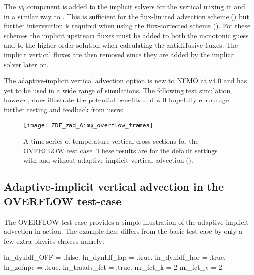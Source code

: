 \documentclass[../main/NEMO_manual]{subfiles}
\begin{document}
The $w_i$ component is added to the implicit solvers for the vertical mixing in
 and  in a similar way to \citep{shchepetkin_OM15}.  This is
sufficient for the flux-limited advection scheme () but further
intervention is required when using the flux-corrected scheme ().
For these schemes the implicit upstream fluxes must be added to both the monotonic guess
and to the higher order solution when calculating the antidiffusive fluxes. The implicit
vertical fluxes are then removed since they are added by the implicit solver later on.

The adaptive-implicit vertical advection option is new to NEMO at v4.0 and has yet to be
used in a wide range of simulations. The following test simulation, however, does illustrate
the potential benefits and will hopefully encourage further testing and feedback from users:

\begin{figure}[!t]
  \centering
  \texttt{[image: ZDF\_zad\_Aimp\_overflow\_frames]}
  \caption[OVERFLOW: time-series of temperature vertical cross-sections]{
    A time-series of temperature vertical cross-sections for the OVERFLOW test case.
    These results are for the default settings with  and
    without adaptive implicit vertical advection ().}
  \label{fig:ZDF_zad_Aimp_overflow_frames}
\end{figure}

\subsection{Adaptive-implicit vertical advection in the OVERFLOW test-case}

The \href{https://forge.ipsl.jussieu.fr/nemo/chrome/site/doc/NEMO/guide/html/test\_cases.html\#overflow}{OVERFLOW test case}
provides a simple illustration of the adaptive-implicit advection in action. The example here differs from the basic test case
by only a few extra physics choices namely:

\begin{forlines}
     ln_dynldf_OFF = .false.
     ln_dynldf_lap = .true.
     ln_dynldf_hor = .true.
     ln_zdfnpc     = .true.
     ln_traadv_fct = .true.
        nn_fct_h   =  2
        nn_fct_v   =  2
\end{forlines}
\end{document}
